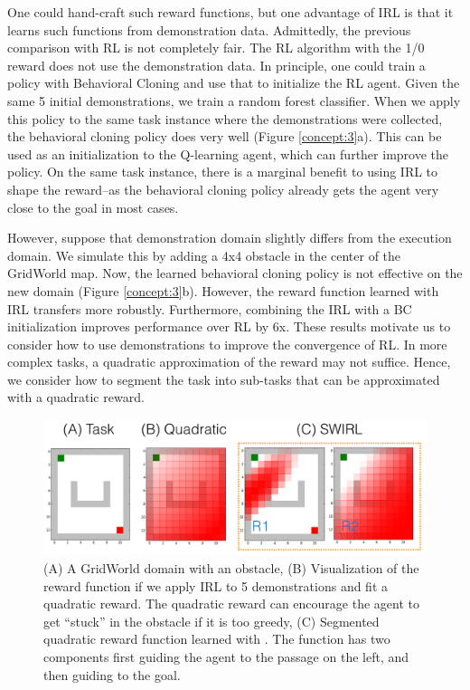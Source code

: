 One could hand-craft such reward functions, but one advantage of IRL is that it learns such functions from demonstration data. Admittedly, the previous comparison with RL is not completely fair. The RL algorithm with the 1/0 reward does not use the demonstration data. In principle, one could train a policy with Behavioral Cloning and use that to initialize the RL agent. Given the same 5 initial demonstrations, we train a random forest classifier.
When we apply this policy to the same task instance where the demonstrations were collected, the behavioral cloning policy does very well (Figure \ref{concept:3}a).
This can be used as an initialization to the Q-learning agent, which can further improve the policy.
On the same task instance, there is a marginal benefit to using IRL to shape the reward--as the behavioral cloning policy already gets the agent very close to the goal in most cases.

However, suppose that demonstration domain slightly differs from the execution domain. We simulate this by adding a 4x4 obstacle in the center of the GridWorld map.
Now, the learned behavioral cloning policy is not effective on the new domain (Figure \ref{concept:3}b).
However, the reward function learned with IRL transfers more robustly.
Furthermore, combining the IRL with a BC initialization improves performance over RL by 6x.
These results motivate us to consider how to use demonstrations to improve the convergence of RL.
In more complex tasks, a quadratic approximation of the reward may not suffice.
Hence, we consider how to segment the task into sub-tasks that can be approximated with a quadratic reward.


\begin{figure}[t]
\centering
 \includegraphics[width=\columnwidth]{concept/swirl-rewards.png}
 \caption{(A) A GridWorld domain with an obstacle, (B) Visualization of the reward function if we apply IRL to 5 demonstrations and fit a quadratic reward. The quadratic reward can encourage the agent to get ``stuck'' in the obstacle if it is too greedy, (C) Segmented quadratic reward function learned with \hirl. The function has two components first guiding the agent to the passage on the left, and then guiding to the goal.  \label{concept:4}}
\end{figure}


